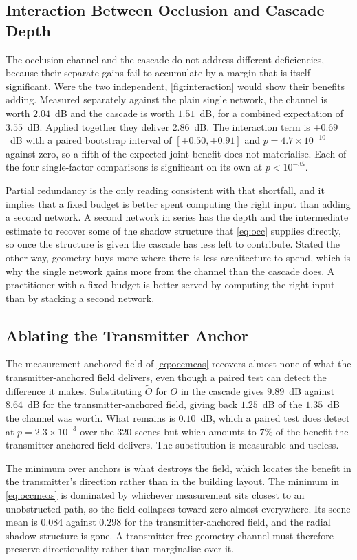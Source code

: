 \subsection{Interaction Between Occlusion and Cascade Depth}
\label{sec:interaction}

The occlusion channel and the cascade do not address different deficiencies, because
their separate gains fail to accumulate by a margin that is itself significant. Were
the two independent, \cref{fig:interaction} would show their benefits adding. Measured
separately against the plain single network, the channel is worth $2.04$~dB and the
cascade is worth $1.51$~dB, for a combined expectation of $3.55$~dB. Applied
together they deliver $2.86$~dB. The interaction term is $+0.69$~dB with a paired
bootstrap interval of $[+0.50, +0.91]$ and $p = 4.7 \times 10^{-10}$ against zero, so
a fifth of the expected joint benefit does not materialise. Each of the four
single-factor comparisons is significant on its own at $p < 10^{-35}$.

Partial redundancy is the only reading consistent with that shortfall, and it implies
that a fixed budget is better spent computing the right input than adding a second
network. A second network in
series has the depth and the intermediate estimate to recover some of the shadow
structure that \cref{eq:occ} supplies directly, so once the structure is given the
cascade has less left to contribute. Stated the other way, geometry buys more where
there is less architecture to spend, which is why the single network gains more
from the channel than the cascade does. A practitioner with a fixed budget is
better served by computing the right input than by stacking a second network.

\subsection{Ablating the Transmitter Anchor}
\label{sec:txfree_result}

The measurement-anchored field of \cref{eq:occmeas} recovers almost none of what the
transmitter-anchored field delivers, even though a paired test can detect the
difference it makes. Substituting $\tilde{O}$ for $O$ in
the cascade gives $9.89$~dB against $8.64$~dB for the transmitter-anchored field,
giving back $1.25$~dB of the $1.35$~dB the channel was worth. What remains is
$0.10$~dB, which a paired test does detect at $p = 2.3 \times 10^{-3}$ over the $320$
scenes but which amounts to $7\%$ of the benefit the transmitter-anchored field
delivers. The substitution is measurable and useless.

The minimum over anchors is what destroys the field, which locates the benefit in
the transmitter's direction rather than in the building layout. The minimum in
\cref{eq:occmeas} is dominated by whichever measurement sits closest to an
unobstructed path, so the field collapses toward zero almost everywhere. Its scene
mean is $0.084$ against $0.298$ for the transmitter-anchored field, and the radial
shadow structure is gone. A transmitter-free geometry channel must therefore
preserve directionality rather than marginalise over it.
